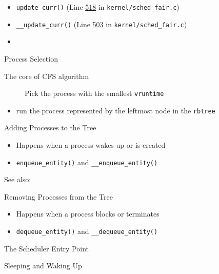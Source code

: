 \begin{itemize}
\item \texttt{update\_curr()} (Line
  \href{http://lxr.linux.no/linux+v2.6.34/kernel/sched\_fair.c\#L518}{518} in
  \texttt{kernel/sched\_fair.c}) 
\item \texttt{\_\_update\_curr()} (Line
  \href{http://lxr.linux.no/linux+v2.6.34/kernel/sched\_fair.c\#L503}{503} in
  \texttt{kernel/sched\_fair.c}) 
\item {}
\end{itemize}

\begin{frame}{Process Selection}
  \begin{description}
  \item[The core of CFS algorithm] Pick the process with the smallest \texttt{vruntime}
  \end{description}
  \begin{itemize}
  \item run the process represented by the leftmost node in the \texttt{rbtree}
  \end{itemize}
  \begin{center}
  \end{center}
\end{frame}

\begin{frame}{Adding Processes to the Tree}
  \begin{itemize}
  \item Happens when a process wakes up or is created
  \item \texttt{enqueue\_entity()} and \texttt{\_\_enqueue\_entity()}
  \end{itemize}
\end{frame}

See also: 

\begin{frame}{Removing Processes from the Tree}
  \begin{itemize}
  \item Happens when a process blocks or terminates
  \item \texttt{dequeue\_entity()} and \texttt{\_\_dequeue\_entity()}
  \end{itemize}
\end{frame}

\begin{frame}{The Scheduler Entry Point}
  
\end{frame}

\begin{frame}{Sleeping and Waking Up}
  
\end{frame}

\printbibliography



